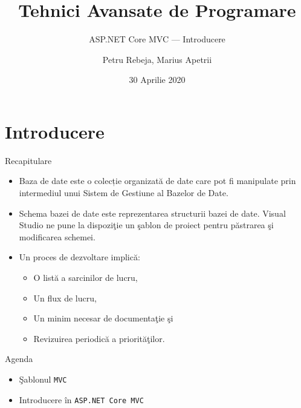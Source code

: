 \documentclass[presentation]{beamer}
\author{Petru Rebeja, Marius Apetrii}
\date{30 Aprilie 2020}
\title{Tehnici Avansate de Programare}
\subtitle{ASP.NET Core MVC --- Introducere}
\institute[UAIC]{Facultatea de Matematică\\Universitatea Alexandru Ioan Cuza, Iași}
\begin{document}
\maketitle
\section{Introducere}
\label{sec:org83f1787}
\begin{frame}[label={sec:org323c90f}]{Recapitulare}
\pause
\begin{itemize}
\item \alert{Baza de date} este o colecție organizată de date care pot fi manipulate prin intermediul unui \alert{Sistem de Gestiune al Bazelor de Date}.
\end{itemize}
\pause
\begin{itemize}
\item \alert{Schema bazei de date} este reprezentarea structurii bazei de date. Visual Studio ne pune la dispoziţie un şablon de proiect pentru păstrarea şi modificarea schemei.
\end{itemize}
\pause
\begin{itemize}
\item Un \alert{proces de dezvoltare} implică:
\begin{itemize}
\item O listă a sarcinilor de lucru,
\item Un flux de lucru,
\item Un minim necesar de documentaţie şi
\item Revizuirea periodică a priorităţilor.
\end{itemize}
\end{itemize}
\end{frame}
\begin{frame}[label={sec:org4b2f3f4},fragile]{Agenda}
 \begin{itemize}
\item Şablonul \texttt{MVC}
\item Introducere în \texttt{ASP.NET Core MVC}
\end{itemize}
\end{frame}
\end{document}
